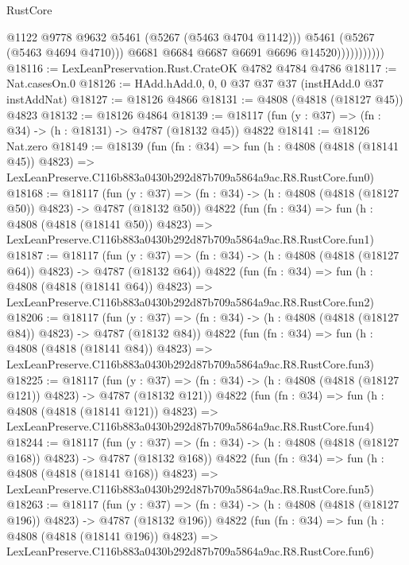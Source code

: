 \begin{lexlean}{RustCore}
\begin{coremodule}
                              @1122
                              @9778
                              @9632
                              @5461
                              (@5267 (@5463 @4704 @1142)))
                            @5461
                            (@5267 (@5463 @4694 @4710)))
                          @6681
                          @6684
                          @6687
                          @6691
                          @6696
                          @14520)))))))))))
@18116 := LexLeanPreservation.Rust.CrateOK @4782 @4784 @4786
@18117 := Nat.casesOn.{0}
@18126 := HAdd.hAdd.{0, 0, 0} @37 @37 @37 (instHAdd.{0} @37 instAddNat)
@18127 := @18126 @4866
@18131 := @4808 (@4818 (@18127 @45)) @4823
@18132 := @18126 @4864
@18139 := @18117 (fun (y : @37) => (fn : @34) -> (h : @18131) -> @4787 (@18132 @45)) @4822
@18141 := @18126 Nat.zero
@18149 := @18139
    (fun (fn : @34) =>
    fun (h : @4808 (@4818 (@18141 @45)) @4823) =>
    LexLeanPreserve.C116b883a0430b292d87b709a5864a9ac.R8.RustCore.fun0)
@18168 := @18117
    (fun (y : @37) => (fn : @34) -> (h : @4808 (@4818 (@18127 @50)) @4823) -> @4787 (@18132 @50))
    @4822
    (fun (fn : @34) =>
    fun (h : @4808 (@4818 (@18141 @50)) @4823) =>
    LexLeanPreserve.C116b883a0430b292d87b709a5864a9ac.R8.RustCore.fun1)
@18187 := @18117
    (fun (y : @37) => (fn : @34) -> (h : @4808 (@4818 (@18127 @64)) @4823) -> @4787 (@18132 @64))
    @4822
    (fun (fn : @34) =>
    fun (h : @4808 (@4818 (@18141 @64)) @4823) =>
    LexLeanPreserve.C116b883a0430b292d87b709a5864a9ac.R8.RustCore.fun2)
@18206 := @18117
    (fun (y : @37) => (fn : @34) -> (h : @4808 (@4818 (@18127 @84)) @4823) -> @4787 (@18132 @84))
    @4822
    (fun (fn : @34) =>
    fun (h : @4808 (@4818 (@18141 @84)) @4823) =>
    LexLeanPreserve.C116b883a0430b292d87b709a5864a9ac.R8.RustCore.fun3)
@18225 := @18117
    (fun (y : @37) => (fn : @34) -> (h : @4808 (@4818 (@18127 @121)) @4823) -> @4787 (@18132 @121))
    @4822
    (fun (fn : @34) =>
    fun (h : @4808 (@4818 (@18141 @121)) @4823) =>
    LexLeanPreserve.C116b883a0430b292d87b709a5864a9ac.R8.RustCore.fun4)
@18244 := @18117
    (fun (y : @37) => (fn : @34) -> (h : @4808 (@4818 (@18127 @168)) @4823) -> @4787 (@18132 @168))
    @4822
    (fun (fn : @34) =>
    fun (h : @4808 (@4818 (@18141 @168)) @4823) =>
    LexLeanPreserve.C116b883a0430b292d87b709a5864a9ac.R8.RustCore.fun5)
@18263 := @18117
    (fun (y : @37) => (fn : @34) -> (h : @4808 (@4818 (@18127 @196)) @4823) -> @4787 (@18132 @196))
    @4822
    (fun (fn : @34) =>
    fun (h : @4808 (@4818 (@18141 @196)) @4823) =>
    LexLeanPreserve.C116b883a0430b292d87b709a5864a9ac.R8.RustCore.fun6)

\end{coremodule}
\end{lexlean}
